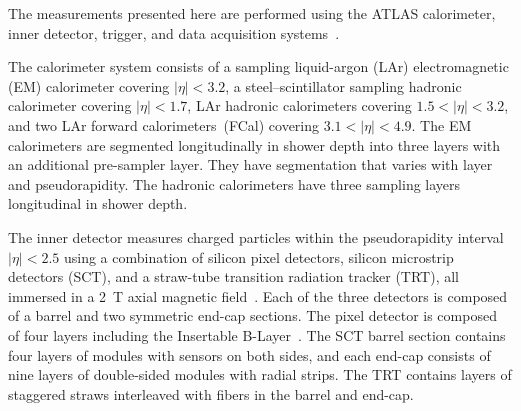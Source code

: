

The measurements presented here are performed using the ATLAS calorimeter, inner detector, trigger,
and data acquisition systems~\cite{Aad:2008zzm}. 

The calorimeter system consists of a sampling liquid-argon (LAr) electromagnetic (EM) calorimeter covering $|\eta|<3.2$, a
steel--scintillator sampling hadronic calorimeter covering $|\eta| <1.7$, LAr hadronic calorimeters covering $1.5 < |\eta| < 3.2$, and
two LAr forward calorimeters~(FCal) covering $3.1 < |\eta| <
4.9$. 
The EM calorimeters are segmented longitudinally in shower depth into three
layers with an additional pre-sampler layer. They
have segmentation that varies with layer and pseudorapidity. 
The hadronic calorimeters have three sampling layers longitudinal
in shower depth.

The inner detector measures charged particles  within the pseudorapidity interval  $|\eta|<2.5$ using a combination of silicon pixel detectors, silicon microstrip detectors (SCT), and a straw-tube transition radiation tracker (TRT), all immersed in a 2~T axial magnetic field~\cite{Aad:2008zzm}. Each of the three detectors is composed of a barrel and two symmetric end-cap sections. The pixel detector is composed of four layers including the Insertable B-Layer~\cite{ibl1,ibl2}. The SCT barrel section contains four layers of modules with sensors on both sides, and each end-cap consists of nine layers of double-sided modules with radial strips. The TRT contains layers of staggered straws interleaved with fibers in the barrel and end-cap.



